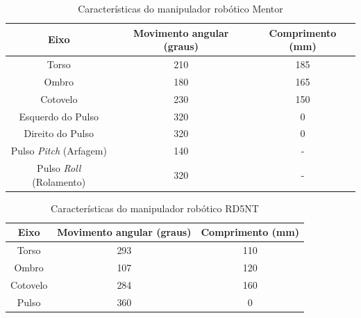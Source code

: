 \begin{table}
    \centering
    \caption{Características do manipulador robótico Mentor}
    \label{tab:caracteristicasManipuladorMentor}
    \begin{tabular}{|c|c|c|}
        \hline
        \textbf{Eixo} & \textbf{Movimento angular (graus)} & \textbf{Comprimento (mm)} \\ \hline
        Torso                    & 210 & 185 \\ \hline
        Ombro                    & 180 & 165 \\ \hline
        Cotovelo                 & 230 & 150 \\ \hline
        Esquerdo do Pulso        & 320 & 0   \\ \hline
        Direito do Pulso         & 320 & 0   \\ \hline
        Pulso \textit{Pitch} (Arfagem)    & 140 & -   \\ \hline
        Pulso \textit{Roll} (Rolamento)    & 320 & -   \\ \hline
    \end{tabular}
\end{table}

\begin{table}
    \centering
    \caption{Características do manipulador robótico RD5NT}
    \label{tab:caracteristicasManipuladorRD5NT}
    \begin{tabular}{|c|c|c|}
        \hline
        \textbf{Eixo} & \textbf{Movimento angular (graus)} & \textbf{Comprimento (mm)} \\ \hline
        Torso            & 293 & 110 \\ \hline
        Ombro            & 107 & 120 \\ \hline
        Cotovelo         & 284 & 160 \\ \hline
        Pulso            & 360 & 0   \\ \hline
    \end{tabular}
\end{table}

